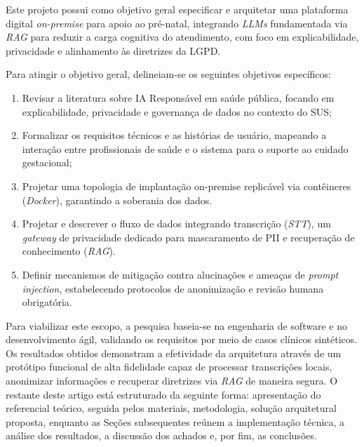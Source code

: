 \documentclass[12pt]{article}
\begin{document}

Este projeto possui como objetivo geral especificar e arquitetar uma plataforma digital \textit{on-premise} para apoio ao pré-natal, integrando \textit{LLMs} fundamentada via \textit{RAG} para reduzir a carga cognitiva do atendimento, com foco em explicabilidade, privacidade e alinhamento às diretrizes da LGPD.


Para atingir o objetivo geral, delineiam-se os seguintes objetivos específicos:

\begin{enumerate}
  \item Revisar a literatura sobre IA Responsável em saúde pública, focando em explicabilidade, privacidade e governança de dados no contexto do SUS;
  \item Formalizar os requisitos técnicos e as histórias de usuário, mapeando a interação entre profissionais de saúde e o sistema para o suporte ao cuidado gestacional;
  \item Projetar uma topologia de implantação on-premise replicável via contêineres (\textit{Docker}), garantindo a soberania dos dados.
  \item Projetar e descrever o fluxo de dados integrando transcrição (\textit{STT}), um \textit{gateway} de privacidade dedicado para mascaramento de PII e recuperação de conhecimento (\textit{RAG}).
  \item Definir mecanismos de mitigação contra alucinações e ameaças de \textit{prompt injection}, estabelecendo protocolos de anonimização e revisão humana obrigatória.
\end{enumerate}

Para viabilizar este escopo, a pesquisa baseia-se na engenharia de software e no desenvolvimento ágil, validando os requisitos por meio de casos clínicos sintéticos.
Os resultados obtidos demonstram a efetividade da arquitetura através de um protótipo funcional de alta fidelidade capaz de processar transcrições locais, anonimizar informações e recuperar diretrizes via \textit{RAG} de maneira segura.
O restante deste artigo está estruturado da seguinte forma: apresentação do referencial teórico, seguida pelos materiais, metodologia, solução arquitetural proposta, enquanto as Seções subsequentes reúnem a implementação técnica, a análise dos resultados, a discussão dos achados e, por fim, as conclusões.

\end{document}
